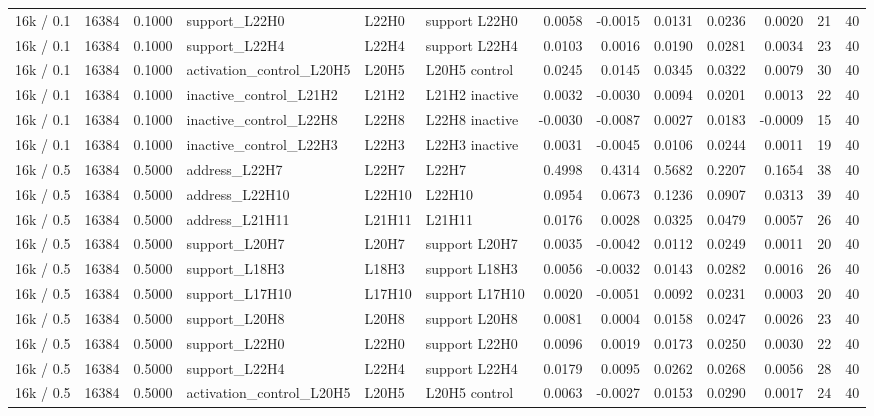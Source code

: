 \begin{tabular}{lrrlllrrrrrrr}
16k / 0.1 & 16384 & 0.1000 & support_L22H0 & L22H0 & support L22H0 & 0.0058 & -0.0015 & 0.0131 & 0.0236 & 0.0020 & 21 & 40 \\
16k / 0.1 & 16384 & 0.1000 & support_L22H4 & L22H4 & support L22H4 & 0.0103 & 0.0016 & 0.0190 & 0.0281 & 0.0034 & 23 & 40 \\
16k / 0.1 & 16384 & 0.1000 & activation_control_L20H5 & L20H5 & L20H5 control & 0.0245 & 0.0145 & 0.0345 & 0.0322 & 0.0079 & 30 & 40 \\
16k / 0.1 & 16384 & 0.1000 & inactive_control_L21H2 & L21H2 & L21H2 inactive & 0.0032 & -0.0030 & 0.0094 & 0.0201 & 0.0013 & 22 & 40 \\
16k / 0.1 & 16384 & 0.1000 & inactive_control_L22H8 & L22H8 & L22H8 inactive & -0.0030 & -0.0087 & 0.0027 & 0.0183 & -0.0009 & 15 & 40 \\
16k / 0.1 & 16384 & 0.1000 & inactive_control_L22H3 & L22H3 & L22H3 inactive & 0.0031 & -0.0045 & 0.0106 & 0.0244 & 0.0011 & 19 & 40 \\
16k / 0.5 & 16384 & 0.5000 & address_L22H7 & L22H7 & L22H7 & 0.4998 & 0.4314 & 0.5682 & 0.2207 & 0.1654 & 38 & 40 \\
16k / 0.5 & 16384 & 0.5000 & address_L22H10 & L22H10 & L22H10 & 0.0954 & 0.0673 & 0.1236 & 0.0907 & 0.0313 & 39 & 40 \\
16k / 0.5 & 16384 & 0.5000 & address_L21H11 & L21H11 & L21H11 & 0.0176 & 0.0028 & 0.0325 & 0.0479 & 0.0057 & 26 & 40 \\
16k / 0.5 & 16384 & 0.5000 & support_L20H7 & L20H7 & support L20H7 & 0.0035 & -0.0042 & 0.0112 & 0.0249 & 0.0011 & 20 & 40 \\
16k / 0.5 & 16384 & 0.5000 & support_L18H3 & L18H3 & support L18H3 & 0.0056 & -0.0032 & 0.0143 & 0.0282 & 0.0016 & 26 & 40 \\
16k / 0.5 & 16384 & 0.5000 & support_L17H10 & L17H10 & support L17H10 & 0.0020 & -0.0051 & 0.0092 & 0.0231 & 0.0003 & 20 & 40 \\
16k / 0.5 & 16384 & 0.5000 & support_L20H8 & L20H8 & support L20H8 & 0.0081 & 0.0004 & 0.0158 & 0.0247 & 0.0026 & 23 & 40 \\
16k / 0.5 & 16384 & 0.5000 & support_L22H0 & L22H0 & support L22H0 & 0.0096 & 0.0019 & 0.0173 & 0.0250 & 0.0030 & 22 & 40 \\
16k / 0.5 & 16384 & 0.5000 & support_L22H4 & L22H4 & support L22H4 & 0.0179 & 0.0095 & 0.0262 & 0.0268 & 0.0056 & 28 & 40 \\
16k / 0.5 & 16384 & 0.5000 & activation_control_L20H5 & L20H5 & L20H5 control & 0.0063 & -0.0027 & 0.0153 & 0.0290 & 0.0017 & 24 & 40 \\

\end{tabular}

